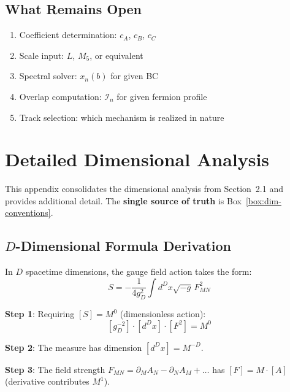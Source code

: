 \documentclass[11pt,a4paper]{article}
\begin{document}
\subsection{What Remains Open}

\begin{enumerate}
    \item Coefficient determination: $c_A$, $c_B$, $c_C$
    \item Scale input: $L$, $M_5$, or equivalent
    \item Spectral solver: $x_n(b)$ for given BC
    \item Overlap computation: $\mathcal{I}_n$ for given fermion profile
    \item Track selection: which mechanism is realized in nature
\end{enumerate}

\appendix

\section{Detailed Dimensional Analysis}
\label{app:dim}

This appendix consolidates the dimensional analysis from Section~2.1 and provides
additional detail. The \textbf{single source of truth} is Box~\ref{box:dim-conventions}.

\subsection{$D$-Dimensional Formula Derivation}

In $D$ spacetime dimensions, the gauge field action takes the form:
\begin{equation}
\label{eq:app-action}
S = -\frac{1}{4g_D^2} \int d^D x \sqrt{-g}\, F_{MN}^2
\end{equation}

\textbf{Step 1}: Requiring $[S] = M^0$ (dimensionless action):
\begin{equation}
\label{eq:app-S-dim}
[g_D^{-2}] \cdot [d^D x] \cdot [F^2] = M^0
\end{equation}

\textbf{Step 2}: The measure has dimension $[d^D x] = M^{-D}$.

\textbf{Step 3}: The field strength $F_{MN} = \partial_M A_N - \partial_N A_M + \ldots$ has
$[F] = M \cdot [A]$ (derivative contributes $M^1$).
\end{document}
